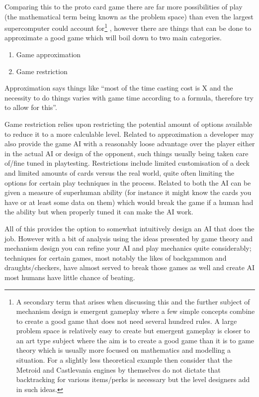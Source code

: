 \documentclass[
]{book}
\providecommand{\tightlist}{%
  \setlength{\itemsep}{0pt}\setlength{\parskip}{0pt}}
\begin{document}
Comparing this to the proto card game there are far more possibilities of play (the mathematical term being known as the problem space) than even the largest supercomputer could account for\footnote{A secondary term that arises when discussing this and the further subject of mechanism design is emergent gameplay where a few simple concepts combine to create a good game that does not need several hundred rules. A large problem space is relatively easy to create but emergent gameplay is closer to an art type subject where the aim is to create a good game than it is to game theory which is usually more focused on mathematics and modelling a situation. For a slightly less theoretical example then consider that the Metroid and Castlevania engines by themselves do not dictate that backtracking for various items/perks is necessary but the level designers add in such ideas.} , however there are things that can be done to approximate a good game which will boil down to two main categories.

\begin{enumerate}
\def\labelenumi{\arabic{enumi}.}
\tightlist
\item
  Game approximation
\item
  Game restriction
\end{enumerate}

Approximation says things like ``most of the time casting cost is X and the necessity to do things varies with game time according to a formula, therefore try to allow for this''.

Game restriction relies upon restricting the potential amount of options available to reduce it to a more calculable level. Related to approximation a developer may also provide the game AI with a reasonably loose advantage over the player either in the actual AI or design of the opponent, such things usually being taken care of/fine tuned in playtesting. Restrictions include limited customisation of a deck and limited amounts of cards versus the real world, quite often limiting the options for certain play techniques in the process. Related to both the AI can be given a measure of superhuman ability (for instance it might know the cards you have or at least some data on them) which would break the game if a human had the ability but when properly tuned it can make the AI work.

All of this provides the option to somewhat intuitively design an AI that does the job. However with a bit of analysis using the ideas presented by game theory and mechanism design you can refine your AI and play mechanics quite considerably; techniques for certain games, most notably the likes of backgammon and draughts/checkers, have almost served to break those games as well and create AI most humans have little chance of beating.
\end{document}
